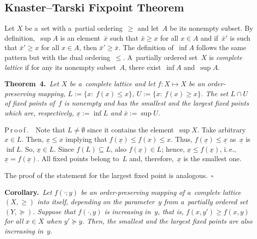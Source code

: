 \begin{multicols}{2}
{%

\subsection*{Knaster--Tarski Fixpoint Theorem}

\noindent
Let $X$ be a~set with a~partial ordering~$\ge$ and let~$A$ be its nonempty 
subset.
By definition,~$\sup A$ is an element~$\bar x$ such that $\bar x\ge x$ for all 
$x\in A$ and if~$\bar x'$ is such that  $\bar x'\ge x$ for all $x\in A$, then 
$\bar x'\ge \bar x$. The definition of~$\inf A$ follows the same pattern but 
with the dual ordering~$\le$.  A~partially ordered set~$X$ is  {\it complete 
lattice} if for any its nonempty subset~$A$,
there exist~$\inf A$ and~$\sup A$.

\smallskip

\noindent
\textbf{Theorem~4.}\
\textit{Let $X$ be a~complete lattice and let $f : X \mapsto X$ be an order-preserving 
mapping, $L:=\{x:\  f(x)\le x\}$, $U:=\{x:\ f(x)\ge x\}$.   The set
$L\cap U$ of fixed points of~$f$
is nonempty and has the smallest and the largest fixed points  which are, 
respectively, $\underline x:=\inf L$ and}   $\bar x:=\sup U$.

\smallskip

 \noindent
P\,r\,o\,o\,f\,.\ \  
Note that $L\neq \emptyset$ since it contains the element~$\sup X$.
Take arbitrary $x\in L$. Then, $\underline x\le x$
implying that $f(\underline x)\le f(x) \le x$. Thus, $f(\underline x)\le 
\underline x$ as~$\underline x$ is~$\inf L$. So, $\underline x\in L$. 
Since $f(L)\subseteq L$, 
also $f(\underline x)\in L$; hence,  $\underline x\le f(\underline x)$, i.\,e., 
$\underline x= f(\underline x)$. All fixed points belong to~$L$ and, 
therefore,~$\underline x$ is the smallest one.

The proof of the statement for the largest fixed point is analogous.~$\square$

\smallskip

 \noindent
 \textbf{Corollary.}\
\textit{Let $f(\cdot;y)$ be an order-preserving mapping of a~complete lattice $(X,\ge)$ into 
itself, depending on the parameter~$y$ from a~partially ordered set 
$(Y,\succeq)$.
Suppose that $f(\cdot,y)$ is increasing in~$y$, that is, $f(x,y')\ge f(x,y)$ for all 
$x\in X$ when $y'\succeq y$.  Then, the smallest and the largest fixed points are 
also increasing in}~$y$.

\smallskip

}
\end{multicols}
